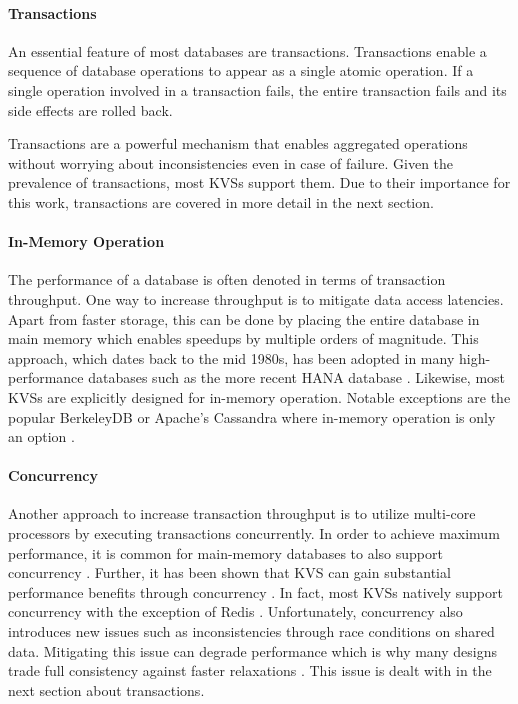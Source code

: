 \paragraph{Transactions}

An essential feature of most databases are transactions. Transactions enable a
sequence of database operations to appear as a single atomic operation. If a
single operation involved in a transaction fails, the entire transaction fails
and its side effects are rolled back.

Transactions are a powerful mechanism that enables aggregated operations without
worrying about inconsistencies even in case of failure. Given the prevalence of
transactions, most \acp{KVS} support them. Due to their importance for this work,
transactions are covered in more detail in the next section.


\paragraph{In-Memory Operation}

The performance of a database is often denoted in terms of transaction
throughput. One way to increase throughput is to mitigate data access latencies.
Apart from faster storage, this can be done by placing the entire database in
main memory which enables speedups by multiple orders of magnitude. This
approach, which dates back to the mid 1980s, has been adopted in many
high-performance databases such as the more recent HANA database
\cite{molina1992main, faerber2012hana}. Likewise, most \acp{KVS} are explicitly
designed for in-memory operation. Notable exceptions are the popular BerkeleyDB
or Apache's Cassandra where in-memory operation is only an option
\cite{bdb2017doc, lakshman2010cassandra}.

\paragraph{Concurrency}

Another approach to increase transaction throughput is to utilize multi-core
processors by executing transactions concurrently. In order to achieve maximum
performance, it is common for main-memory databases to also support concurrency
\cite{grund2010hyrise, faerber2012hana, diaconu2013hekaton}. Further, it has
been shown that \ac{KVS} can gain substantial performance benefits through
concurrency \cite{fan2013memc3, li2015architecting, xu2014building}. In fact,
most \acp{KVS} natively support concurrency with the exception of Redis
\cite{redis2017home}. Unfortunately, concurrency also introduces new issues such
as inconsistencies through race conditions on shared data. Mitigating this issue
can degrade performance which is why many designs trade full consistency against
faster relaxations \cite{decandia2007dynamo}. This issue is dealt with in the
next section about transactions.


